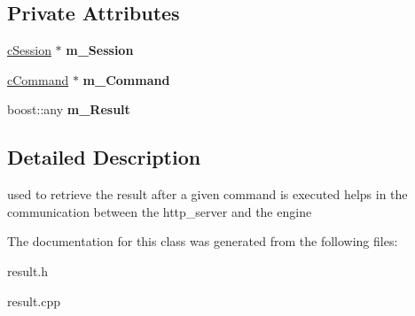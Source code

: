 \subsection*{\-Private \-Attributes}
\begin{DoxyCompactItemize}
\item 
\hypertarget{classengine_1_1cResult_ab4a2a6e829775978c141dc4f18398321}{\hyperlink{classengine_1_1cSession}{c\-Session} $\ast$ {\bfseries m\-\_\-\-Session}}\label{classengine_1_1cResult_ab4a2a6e829775978c141dc4f18398321}

\item 
\hypertarget{classengine_1_1cResult_ae5500a8cd5d5c860c9c3c71a9bd687f1}{\hyperlink{classengine_1_1cCommand}{c\-Command} $\ast$ {\bfseries m\-\_\-\-Command}}\label{classengine_1_1cResult_ae5500a8cd5d5c860c9c3c71a9bd687f1}

\item 
\hypertarget{classengine_1_1cResult_a445a8b5495ec68e809fe85b5876a5bc7}{boost\-::any {\bfseries m\-\_\-\-Result}}\label{classengine_1_1cResult_a445a8b5495ec68e809fe85b5876a5bc7}

\end{DoxyCompactItemize}


\subsection{\-Detailed \-Description}
used to retrieve the result after a given command is executed helps in the communication between the http\-\_\-server and the engine 

\-The documentation for this class was generated from the following files\-:\begin{DoxyCompactItemize}
\item 
result.\-h\item 
result.\-cpp\end{DoxyCompactItemize}
